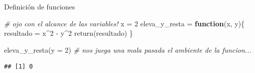 \documentclass[
  ignorenonframetext,
]{beamer}
\newenvironment{Shaded}{\begin{snugshade}}{\end{snugshade}}
\newcommand{\AttributeTok}[1]{\textcolor[rgb]{0.77,0.63,0.00}{#1}}
\newcommand{\CommentTok}[1]{\textcolor[rgb]{0.56,0.35,0.01}{\textit{#1}}}
\newcommand{\ControlFlowTok}[1]{\textcolor[rgb]{0.13,0.29,0.53}{\textbf{#1}}}
\newcommand{\DecValTok}[1]{\textcolor[rgb]{0.00,0.00,0.81}{#1}}
\newcommand{\FunctionTok}[1]{\textcolor[rgb]{0.00,0.00,0.00}{#1}}
\newcommand{\NormalTok}[1]{#1}
\newcommand{\OtherTok}[1]{\textcolor[rgb]{0.56,0.35,0.01}{#1}}
\newcommand{\SpecialCharTok}[1]{\textcolor[rgb]{0.00,0.00,0.00}{#1}}
\begin{document}
\begin{frame}[fragile]{Definición de funciones}
\protect\hypertarget{definiciuxf3n-de-funciones-6}{}
\begin{Shaded}
\begin{Highlighting}[]
\CommentTok{\# ojo con el alcance de las variables! }
\NormalTok{x }\OtherTok{=} \DecValTok{2}
\NormalTok{eleva\_y\_resta }\OtherTok{=} \ControlFlowTok{function}\NormalTok{(x, y)\{}
\NormalTok{  resultado }\OtherTok{=}\NormalTok{ x}\SpecialCharTok{\^{}}\DecValTok{2} \SpecialCharTok{{-}}\NormalTok{ y}\SpecialCharTok{\^{}}\DecValTok{2}
  \FunctionTok{return}\NormalTok{(resultado)}
\NormalTok{\}}

\FunctionTok{eleva\_y\_resta}\NormalTok{(}\AttributeTok{y =} \DecValTok{2}\NormalTok{) }\CommentTok{\# nos juega una mala pasada el ambiente de la funcion...}
\end{Highlighting}
\end{Shaded}

\begin{verbatim}
## [1] 0
\end{verbatim}
\end{frame}
\end{document}
